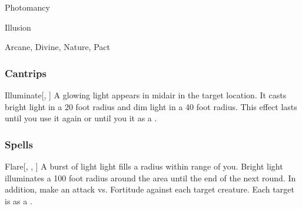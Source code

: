 \newpage
\begin{spellsection}{Photomancy}

\begin{spellheader}
\end{spellheader}


 Illusion

 Arcane, Divine, Nature, Pact

\subsubsection{Cantrips}


\begin{freeability}{Illuminate}[, ]
A glowing light appears in midair in the target location.
It casts bright light in a 20 foot radius and dim light in a 40 foot radius.
This effect lasts until you use it again or until you  it as a .
\end{freeability}

\end{spellsection}


\subsubsection{Spells}


\lowercase{\hypertarget{spell:Flare}{}}\label{spell:Flare}
\begin{freeability}[Rank 1]{\hypertarget{spell:Flare}{Flare}}[, , ]
A burst of light light fills a \areasmall radius  within \rngmed range of you.
Bright light illuminates a 100 foot radius around the area until the end of the next round.
In addition, make an attack vs. Fortitude against each target creature.
\hit Each target is \dazzled as a .
\end{freeability}
\vspace{0.25em}



